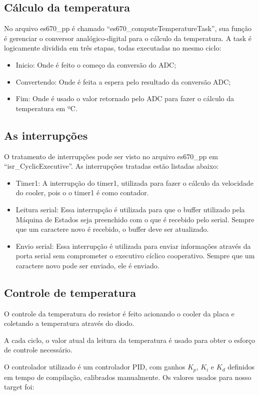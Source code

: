 \documentclass{article}
\begin{document}
\subsection{Cálculo da temperatura}
No arquivo es670\_pp é chamado ``es670\_computeTemperatureTask'', sua função é gerenciar o conversor analógico-digital para o cálculo da temperatura.
A task é logicamente dividida em três etapas, todas executadas no mesmo ciclo:
\begin{itemize}
\item Inicio: Onde é feito o começo da conversão do ADC;
\item Convertendo: Onde é feita a espera pelo resultado da conversão ADC;
\item Fim: Onde é usado o valor retornado pelo ADC para fazer o cálculo da temperatura em ºC.
\end{itemize}

\subsection{As interrupções}
O tratamento de interrupções pode ser visto no arquivo es670\_pp em ``isr\_CyclicExecutive''. As interrupções tratadas estão listadas abaixo:
\begin{itemize}
\item Timer1: A interrupção do timer1, utilizada para fazer o cálculo da velocidade do cooler, pois o o timer1 é como contador.
\item Leitura serial: Essa interrupção é utilizada para que o buffer utilizado pela Máquina de Estados seja preenchido com o que é recebido pelo serial. Sempre que um caractere novo é recebido, o buffer deve ser atualizado.
\item Envio serial: Essa interrupção é utilizada para enviar informações através da porta serial sem comprometer o executivo cíclico cooperativo. Sempre que um caractere novo pode ser enviado, ele é enviado.
\end{itemize}

\subsection{Controle de temperatura}
O controle da temperatura do resistor é feito acionando o cooler da placa e coletando a temperatura através do diodo.

A cada ciclo, o valor atual da leitura da temperatura é usado para obter o esforço de controle necessário.

O controlador utilizado é um controlador PID, com ganhos $K_p$, $K_i$ e $K_d$ definidos em tempo de compilação, calibrados manualmente. Os valores usados para nosso target foi:
\end{document}
